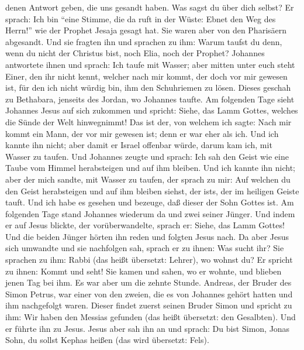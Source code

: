 denen Antwort geben, die uns gesandt haben. Was sagst du über dich
selbst?  Er sprach: Ich bin ``eine Stimme, die da ruft in
der Wüste: Ebnet den Weg des Herrn!'' wie der Prophet Jesaja gesagt hat.
 Sie waren aber von den Pharisäern abgesandt.
 Und sie fragten ihn und sprachen zu ihm: Warum taufst du
denn, wenn du nicht der Christus bist, noch Elia, noch der Prophet?
 Johannes antwortete ihnen und sprach: Ich taufe mit
Wasser; aber mitten unter euch steht Einer, den ihr nicht kennt,
 welcher nach mir kommt, der doch vor mir gewesen ist,
für den ich nicht würdig bin, ihm den Schuhriemen zu lösen.
 Dieses geschah zu Bethabara, jenseits des Jordan, wo
Johannes taufte.  Am folgenden Tage sieht Johannes Jesus
auf sich zukommen und spricht: Siehe, das Lamm Gottes, welches die Sünde
der Welt hinwegnimmt!  Das ist der, von welchem ich
sagte: Nach mir kommt ein Mann, der vor mir gewesen ist; denn er war
eher als ich.  Und ich kannte ihn nicht; aber damit er
Israel offenbar würde, darum kam ich, mit Wasser zu taufen.
 Und Johannes zeugte und sprach: Ich sah den Geist wie
eine Taube vom Himmel herabsteigen und auf ihm bleiben. 
Und ich kannte ihn nicht; aber der mich sandte, mit Wasser zu taufen,
der sprach zu mir: Auf welchen du den Geist herabsteigen und auf ihm
bleiben siehst, der ist\textquotesingle s, der im heiligen Geiste tauft.
 Und ich habe es gesehen und bezeuge, daß dieser der Sohn
Gottes ist.  Am folgenden Tage stand Johannes wiederum da
und zwei seiner Jünger.  Und indem er auf Jesus blickte,
der vorüberwandelte, sprach er: Siehe, das Lamm Gottes! 
Und die beiden Jünger hörten ihn reden und folgten Jesus nach.
 Da aber Jesus sich umwandte und sie nachfolgen sah,
sprach er zu ihnen: Was sucht ihr? Sie sprachen zu ihm: Rabbi (das heißt
übersetzt: Lehrer), wo wohnst du?  Er spricht zu ihnen:
Kommt und seht! Sie kamen und sahen, wo er wohnte, und blieben jenen Tag
bei ihm. Es war aber um die zehnte Stunde.  Andreas, der
Bruder des Simon Petrus, war einer von den zweien, die es von Johannes
gehört hatten und ihm nachgefolgt waren.  Dieser findet
zuerst seinen Bruder Simon und spricht zu ihm: Wir haben den Messias
gefunden (das heißt übersetzt: den Gesalbten).  Und er
führte ihn zu Jesus. Jesus aber sah ihn an und sprach: Du bist Simon,
Jonas Sohn, du sollst Kephas heißen (das wird übersetzt: Fels).
